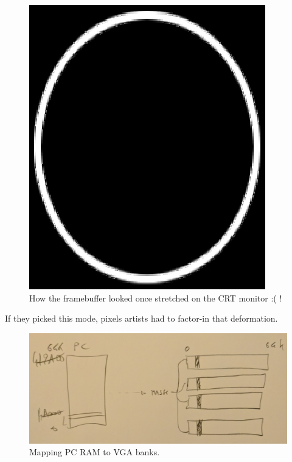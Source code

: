 \documentclass[book.tex]{subfiles}
\begin{document}
\begin{itemize}
 \begin{figure}[H]
\centering
\includegraphics[width=\textwidth]{imgs/circlescreen.eps}
%
\caption{How the framebuffer looked once stretched on the CRT monitor :( !}
\end{figure}
\par
If they picked this mode, pixels artists had to factor-in that deformation.\\
\par
{}
 \begin{figure}[H]
\centering
  
      \includegraphics[width=\textwidth]{imgs/ram_to_vga_maping.png}
    
\caption{Mapping PC RAM to VGA banks.}
\end{figure}

\end{itemize}
\end{document}
